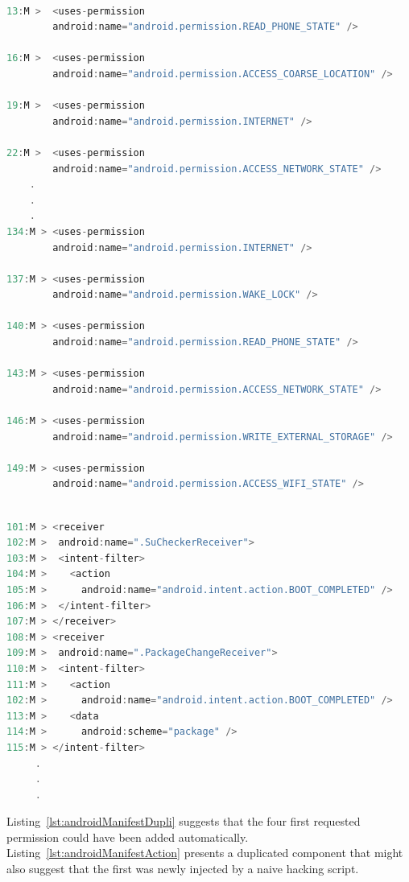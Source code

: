 \begin{lstlisting}[caption={Example of duplicated permission from malicious version of app (com.ifeel.frogjump)}, language=Java,
    basicstyle=\fontsize{5}{4}\selectfont\ttfamily,
    label={lst:androidManifestDupli}]

13:M >  <uses-permission
        android:name="android.permission.READ_PHONE_STATE" />

16:M >  <uses-permission
        android:name="android.permission.ACCESS_COARSE_LOCATION" />

19:M >  <uses-permission
        android:name="android.permission.INTERNET" />

22:M >  <uses-permission
        android:name="android.permission.ACCESS_NETWORK_STATE" />
    .
    .
    .
134:M > <uses-permission
        android:name="android.permission.INTERNET" />

137:M > <uses-permission
        android:name="android.permission.WAKE_LOCK" />

140:M > <uses-permission
        android:name="android.permission.READ_PHONE_STATE" />

143:M > <uses-permission
        android:name="android.permission.ACCESS_NETWORK_STATE" />

146:M > <uses-permission
        android:name="android.permission.WRITE_EXTERNAL_STORAGE" />

149:M > <uses-permission
        android:name="android.permission.ACCESS_WIFI_STATE" />
\end{lstlisting}

\begin{lstlisting}[caption={An example of duplicated component capability from malicious version of app (com.koushikdutta.superuser)}, language=Java,
    basicstyle=\fontsize{5}{4}\selectfont\ttfamily,
    label={lst:androidManifestAction}]

101:M > <receiver
102:M >  android:name=".SuCheckerReceiver">
103:M >  <intent-filter>
104:M >    <action
105:M >      android:name="android.intent.action.BOOT_COMPLETED" />                 
106:M >  </intent-filter>
107:M > </receiver>
108:M > <receiver
109:M >  android:name=".PackageChangeReceiver">
110:M >  <intent-filter>
111:M >    <action
102:M >      android:name="android.intent.action.BOOT_COMPLETED" />
113:M >    <data
114:M >      android:scheme="package" />
115:M > </intent-filter>
     .
     .
     .
\end{lstlisting}

Listing~\ref{lst:androidManifestDupli} suggests that the four first requested permission could have been added automatically. Listing~\ref{lst:androidManifestAction} presents a duplicated component that might also suggest that the first was newly injected by a naive hacking script.


